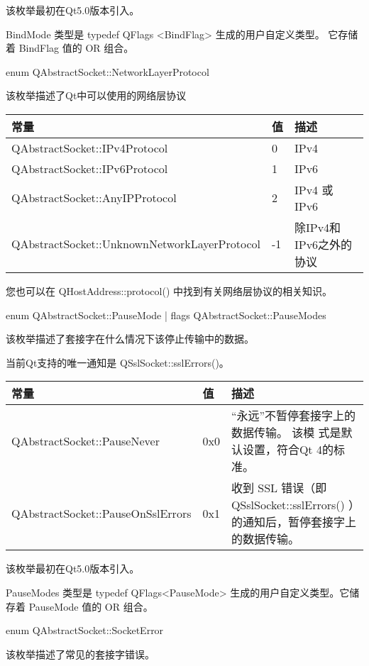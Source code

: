 该枚举最初在Qt5.0版本引入。

BindMode 类型是 typedef QFlags <BindFlag> 生成的用户自定义类型。 它存储着 BindFlag 值的 OR 组合。

enum QAbstractSocket::NetworkLayerProtocol

该枚举描述了Qt中可以使用的网络层协议

\begin{tabular}{|m{26em}|m{2em}|m{8em}|}
\hline
常量&值&描述 \\
\hline
QAbstractSocket::IPv4Protocol&	0	&IPv4\\
\hline
QAbstractSocket::IPv6Protocol&	1	&IPv6\\
\hline
QAbstractSocket::AnyIPProtocol&	2	&IPv4 或 IPv6\\
\hline
QAbstractSocket::UnknownNetworkLayerProtocol&	-1	&除IPv4和IPv6之外的协议\\
\hline
\end{tabular}

您也可以在 QHostAddress::protocol() 中找到有关网络层协议的相关知识。

enum QAbstractSocket::PauseMode | flags QAbstractSocket::PauseModes

该枚举描述了套接字在什么情况下该停止传输中的数据。 

当前Qt支持的唯一通知是 QSslSocket::sslErrors()。

\begin{tabular}{|m{19em}|m{2em}|m{18em}|}
\hline
常量	&值&	描述\\
\hline
QAbstractSocket::PauseNever&	0x0&	“永远”不暂停套接字上的数据传输。 该模
  式是默认设置，符合Qt 4的标准。\\
\hline
QAbstractSocket::PauseOnSslErrors&	0x1&	收到 SSL 错误（即 QSslSocket::sslErrors() ）的通知后，暂停套接字上的数据传输。\\
\hline
\end{tabular}

该枚举最初在Qt5.0版本引入。

PauseModes 类型是 typedef QFlags<PauseMode> 生成的用户自定义类型。它储存着 PauseMode 值的 OR 组合。

enum QAbstractSocket::SocketError

该枚举描述了常见的套接字错误。

